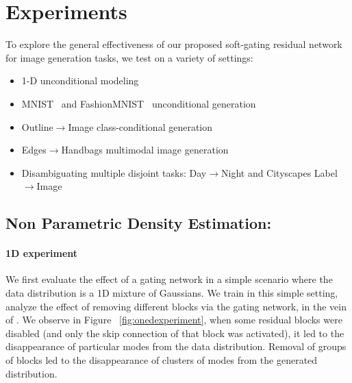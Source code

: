 \section{Experiments}

\noindent To explore the general effectiveness of our proposed soft-gating residual network for image generation tasks, we test on a variety of settings:


\begin{itemize}[noitemsep]
\item {1-D unconditional modeling}
\item {MNIST~\cite{XX} and FashionMNIST~\cite{XX} unconditional generation}
\item {Outline$\rightarrow$Image class-conditional generation}
\item {Edges$\rightarrow$Handbags multimodal image generation}
\item {Disambiguating multiple disjoint tasks: Day$\rightarrow$Night and Cityscapes Label$\rightarrow$Image}
\end{itemize}

\subsection{Non Parametric Density Estimation:}

\paragraph{1D experiment}
We first evaluate the effect of a gating network in a simple scenario where the data distribution is a 1D mixture of Gaussians. 
We train \model{} in this simple setting, analyze the effect of removing different blocks via the gating network, in the vein of \cite{veit2016residual}.
We observe in Figure ~\ref{fig:onedexperiment}, when some residual blocks were disabled (and only the skip connection of that block was activated), it led to the disappearance of particular modes from the data distribution. 
Removal of groups of blocks led to the disappearance of clusters of modes from the generated distribution. 

